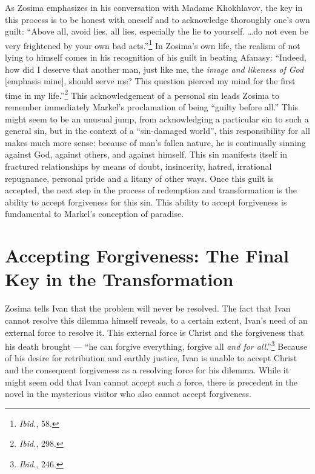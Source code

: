 As Zosima emphasizes in his conversation with Madame Khokhlavov, the key in this process is to be honest with oneself and to acknowledge thoroughly one's own guilt: ``Above all, avoid lies, all lies, especially the lie to yourself. \ldots do not even be very frightened by your own bad acts.''\footnote{\emph{Ibid.}, 58.} In Zosima's own life, the realism of not lying to himself comes in his recognition of his guilt in beating Afanasy: ``Indeed, how did I deserve that another man, just like me, the \emph{image and likeness of God} [emphasis mine], should serve me? This question pierced my mind for the first time in my life.''\footnote{\emph{Ibid.}, 298.} This acknowledgement of a personal sin leads Zosima to remember immediately Markel's proclamation of being ``guilty before all.'' This might seem to be an unusual jump, from acknowledging a particular sin to such a general sin, but in the context of a ``sin-damaged world'', this responsibility for all makes much more sense: because of man's fallen nature, he is continually sinning against God, against others, and against himself. This sin manifests itself in fractured relationships by means of doubt, insincerity, hatred, irrational repugnance, personal pride and a litany of other ways. Once this guilt is accepted, the next step in the process of redemption and transformation is the ability to accept forgiveness for this sin. This ability to accept forgiveness is fundamental to Markel's conception of paradise.

\section{Accepting Forgiveness: The Final Key in the Transformation}
Zosima tells Ivan that the problem will never be resolved. The fact that Ivan cannot resolve this dilemma himself reveals, to a certain extent, Ivan's need of an external force to resolve it. This external force is Christ and the forgiveness that his death brought --- ``he can forgive everything, forgive all \emph{and for all}.''\footnote{\emph{Ibid.}, 246.} Because of his desire for retribution and earthly justice, Ivan is unable to accept Christ and the consequent forgiveness as a resolving force for his dilemma. While it might seem odd that Ivan cannot accept such a force, there is precedent in the novel in the mysterious visitor who also cannot accept forgiveness.

